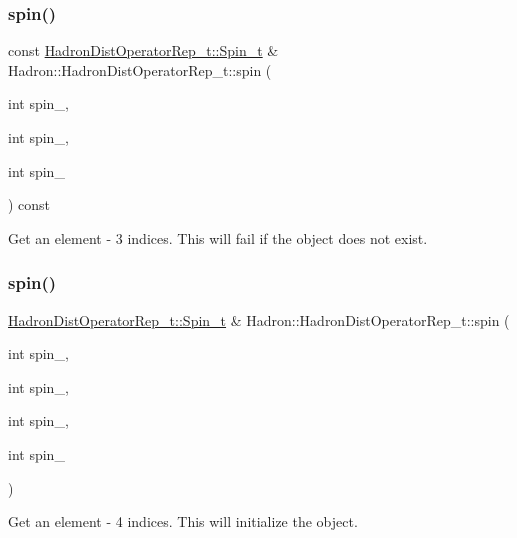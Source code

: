 \subsubsection{\texorpdfstring{spin()}{spin()}\hspace{0.1cm}{\footnotesize\ttfamily [8/16]}}
{\footnotesize\ttfamily const \mbox{\hyperlink{structHadron_1_1HadronDistOperatorRep__t_1_1Spin__t}{Hadron\+Dist\+Operator\+Rep\+\_\+t\+::\+Spin\+\_\+t}} \& Hadron\+::\+Hadron\+Dist\+Operator\+Rep\+\_\+t\+::spin (\begin{DoxyParamCaption}\item[{int}]{spin\+\_,  }\item[{int}]{spin\+\_,  }\item[{int}]{spin\+\_ }\end{DoxyParamCaption}) const}



Get an element -\/ 3 indices. This will fail if the object does not exist. 

\mbox{\label{classHadron_1_1HadronDistOperatorRep__t_a42ba0b0eff80de32178f0cee67dcbfa1}} 
\subsubsection{\texorpdfstring{spin()}{spin()}\hspace{0.1cm}{\footnotesize\ttfamily [9/16]}}
{\footnotesize\ttfamily \mbox{\hyperlink{structHadron_1_1HadronDistOperatorRep__t_1_1Spin__t}{Hadron\+Dist\+Operator\+Rep\+\_\+t\+::\+Spin\+\_\+t}} \& Hadron\+::\+Hadron\+Dist\+Operator\+Rep\+\_\+t\+::spin (\begin{DoxyParamCaption}\item[{int}]{spin\+\_,  }\item[{int}]{spin\+\_,  }\item[{int}]{spin\+\_,  }\item[{int}]{spin\+\_ }\end{DoxyParamCaption})}



Get an element -\/ 4 indices. This will initialize the object. 

\mbox{\label{classHadron_1_1HadronDistOperatorRep__t_a9e487417c5103150be6302d8fd3024b9}} 
